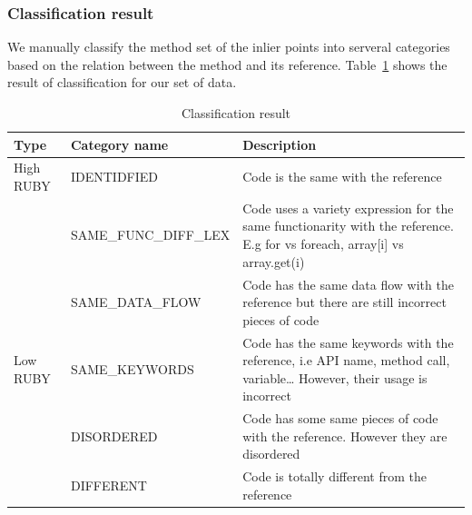 \subsubsection{Classification result}
We manually classify the method set of the inlier points into serveral categories based on the relation between the method and its reference. Table~\ref{table:Classification_result} shows the result of classification for our set of data.
\begin{table}[]
	\centering
	\caption{Classification result}
	\label{table:Classification_result}
	\begin{tabular}{|m{1cm}|m{3cm}|m{4cm}}
		\hline
		Type      & Category name         & Description                                                                                                                    
		\\
		\hline
		High RUBY & IDENTIDFIED           & Code is the same with the reference                                                                                             \\
		& SAME\_FUNC\_DIFF\_LEX & Code uses a variety expression for the same functionarity with the reference. E.g for vs foreach, array[i] vs array.get(i)\\
		& SAME\_DATA\_FLOW      & Code has the same data flow with the reference but there are still incorrect pieces of code                                     \\
		\hline
		Low RUBY  & SAME\_KEYWORDS        & Code has the same keywords with the reference, i.e API name, method call, variable… However, their usage is incorrect           \\
		& DISORDERED            & Code has some same pieces of code with the reference. However they are disordered                                               \\
		& DIFFERENT             & Code is totally different from the reference \\
		\hline                                                                                   
	\end{tabular}
\end{table}